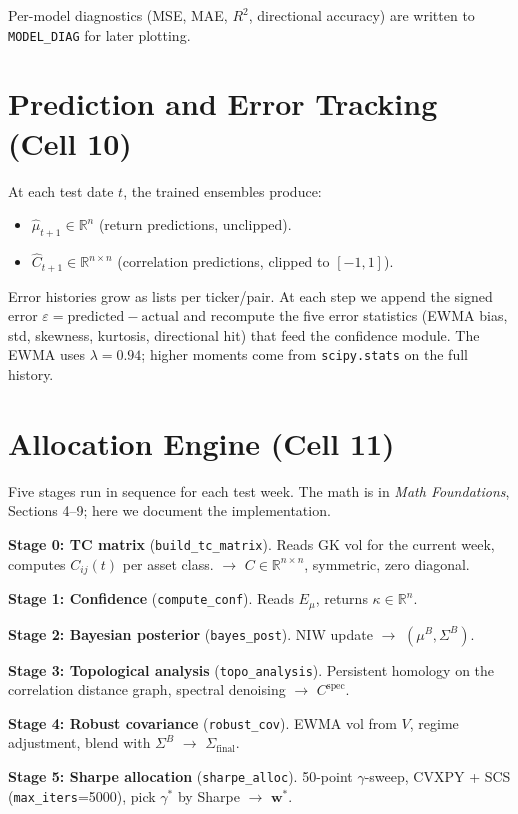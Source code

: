 \documentclass[11pt]{article}
\newcommand{\code}[1]{\texttt{#1}}
\begin{document}
Per-model diagnostics (MSE, MAE, $R^2$, directional accuracy) are
written to \code{MODEL\_DIAG} for later plotting.

\section{Prediction and Error Tracking (Cell 10)}\label{sec:predict}

At each test date $t$, the trained ensembles produce:

\begin{itemize}
\item $\hat\mu_{t+1}\in\mathbb{R}^n$ (return predictions, unclipped).
\item $\hat C_{t+1}\in\mathbb{R}^{n\times n}$ (correlation predictions, clipped to $[-1,1]$).
\end{itemize}

Error histories grow as lists per ticker/pair.  At each step we append
the signed error $\varepsilon = \text{predicted} - \text{actual}$ and
recompute the five error statistics (EWMA bias, std, skewness, kurtosis,
directional hit) that feed the confidence module.
The EWMA uses $\lambda=0.94$; higher moments come from \code{scipy.stats}
on the full history.

\section{Allocation Engine (Cell 11)}\label{sec:alloc}

Five stages run in sequence for each test week.
The math is in \textit{Math Foundations}, Sections 4--9; here we
document the implementation.

\begin{tcolorbox}[colback=gray!3, colframe=gray!50!black]
\textbf{Stage 0: TC matrix} (\code{build\_tc\_matrix}).
Reads GK vol for the current week, computes $C_{ij}(t)$ per asset class.
$\to$ $C\in\mathbb{R}^{n\times n}$, symmetric, zero diagonal.

\textbf{Stage 1: Confidence} (\code{compute\_conf}).
Reads $E_\mu$, returns $\kappa\in\mathbb{R}^n$.

\textbf{Stage 2: Bayesian posterior} (\code{bayes\_post}).
NIW update $\to$ $(\mu^B,\Sigma^B)$.

\textbf{Stage 3: Topological analysis} (\code{topo\_analysis}).
Persistent homology on the correlation distance graph,
spectral denoising $\to$ $C^{\mathrm{spec}}$.

\textbf{Stage 4: Robust covariance} (\code{robust\_cov}).
EWMA vol from $V$, regime adjustment, blend with $\Sigma^B$
$\to$ $\Sigma_{\mathrm{final}}$.

\textbf{Stage 5: Sharpe allocation} (\code{sharpe\_alloc}).
50-point $\gamma$-sweep, CVXPY + SCS (\code{max\_iters}=5000),
pick $\gamma^*$ by Sharpe $\to$ $\bm{w}^*$.
\end{tcolorbox}
\end{document}
